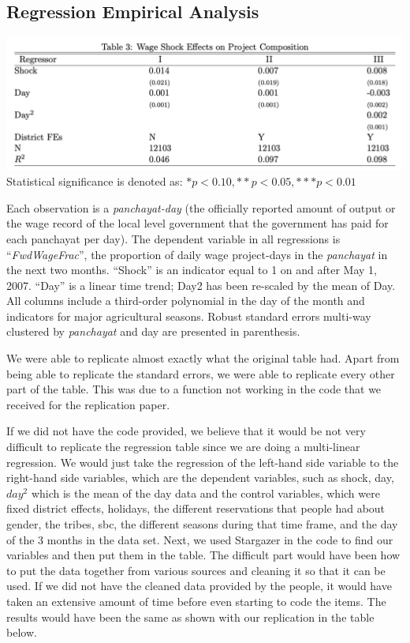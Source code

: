 \documentclass[12pt]{article}
\begin{document}
\subsection{Regression Empirical Analysis}
\includegraphics[scale=0.42]{Regression.png}
Statistical significance is denoted as: $*p < 0.10, **p < 0.05, ***p < 0.01$
\newline

Each observation is a \emph{panchayat-day} (the officially reported amount of output or the wage record of the local level government that the government has paid for each panchayat per day). The dependent variable in all regressions is “\emph{FwdWageFrac}”, the proportion of daily wage project-days in the \emph{panchayat} in the next two months. “Shock” is an indicator equal to 1 on and after May 1, 2007. “Day” is a linear time trend; Day2 has been re-scaled by the mean of Day. All columns include a third-order polynomial in the day of the month and indicators for major agricultural seasons. Robust standard errors multi-way clustered by \emph{panchayat} and day are presented in parenthesis. 

We were able to replicate almost exactly what the original table had. Apart from being able to replicate the standard errors, we were able to replicate every other part of the table. This was due to a function not working in the code that we received for the replication paper.  

If we did not have the code provided, we believe that it would be not very difficult to replicate the regression table since we are doing a multi-linear regression. We would just take the regression of the left-hand side variable to the right-hand side variables, which are the dependent variables, such as shock, day, $day^2$ which is the mean of the day data and the control variables, which were fixed district effects, holidays, the different reservations that people had about gender, the tribes, sbc, the different seasons during that time frame, and the day of the 3 months in the data set. Next, we used Stargazer in the code to find our variables and then put them in the table. The difficult part would have been how to put the data together from various sources and cleaning it so that it can be used. If we did not have the cleaned data provided by the people, it would have taken an extensive amount of time before even starting to code the items. The results would have been the same as shown with our replication in the table below. 
\end{document}
